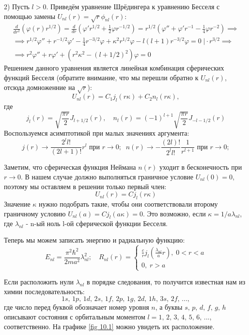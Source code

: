 2) Пусть $l > 0$. Приведём уравнение Шрёдингера к уравнению Бесселя с помощью замены $U_{nl}(r) = \sqrt{r}\phi_{nl}(r)$:
\begin{gather*}
\frac{d}{dr^2}\left(\varphi(r)r^{1/2}\right) = \frac{d}{dr}\left( \varphi'r^{1/2} + \frac{1}{2}\varphi r^{-1/2} \right) = r^{1/2}\left(\varphi'' + \varphi'r^{-1} - \frac{1}{4}\varphi r^{-2}\right) \implies \\
\implies r^{1/2}\varphi'' + r^{-1/2}\varphi' - \frac{1}{4}r^{-3/2}\varphi + \kappa^2r^{1/2}\varphi - l(l+1)r^{-3/2}\varphi = 0 \; \Bigg| \cdot r^{3/2} \implies \\
\implies r^2\varphi''+ r\varphi' + (r^2\kappa^2 - (l+1/2)^2)\varphi = 0
\end{gather*}
Решением данного уравнения является линейная комбинация сферических функций Бесселя (обратите внимание, что мы перешли обратно к $U_{nl}(r)$, отсюда домноженние на $\sqrt{r}$):
\[
U_{nl}(r) = C_1j_l(r\kappa) + C_2n_l(r\kappa),
\]
где
\[
j_l(r) = \sqrt{\frac{\pi r}{2}}J_{l+1/2}(r), \quad n_l(r) = (-1)^{l+1}\sqrt{\frac{\pi r}{2}}J_{-l-1/2}(r)
\]
Воспользуемся асимптотикой при малых значениях аргумента:
\[
j(r)\rightarrow\frac{2^l l!}{(2l+1)!}r^l \text{ при } r\rightarrow0; \;\; n(r)\rightarrow -\frac{(2l)!}{2^l l!}\frac{1}{r^{l+1}} \text{ при } r\rightarrow 0; 
\]

Заметим, что сферическая функция Неймана $n(r)$ уходит в бесконечность при $r \rightarrow 0$. В нашем случае должно выполняться граничное условие $U_{nl}(0) = 0$, поэтому мы оставляем в решении только первый член:
\[
U_{nl}(r) = Cj_l(r\kappa)
\]
Значение $\kappa$ нужно подобрать такие, чтобы они соответствовали второму граничному условию $U_{nl}(a) = Cj_l(a\kappa) = 0$. Это возможно, если $\kappa = 1/a \lambda_{nl}$, где $\lambda_{nl}$ - n-ый ноль l-ой сферической функции Бесселя. 

Теперь мы можем записать энергию и радиальную функцию:
\[
E_{nl} = \frac{\pi^2\hbar^2}{2ma^2}\lambda_{nl}^2;\quad R_{nl}(r) =
\begin{cases}
    \frac{c}{r}j_{l}\left( \frac{\lambda_{nl}}{a}r \right), \; 0 < r < a\\
    0, \; r > a
\end{cases}
\]

Если расположить нули $\lambda_{nl}$ в порядке следования, то получится известная нам из химии последовательность:
\[
1s,\,1p,\,1d,\,2s,\,1f,\,2p,\,1g,\,2d,\,1h,\,3s,\,2f,\, ...,
\]
где число перед буквой обозначает номер уровня $n$, а буквы $s,\,p,\,d,\,f,\,g,\,h$ описывают состояния с орбитальным моментом $l=1,\,2,\,3,\,4,\,5,\,6,\,...$, соответственно. На графике \ref{fig 10.1} можно увидеть их расположение.

